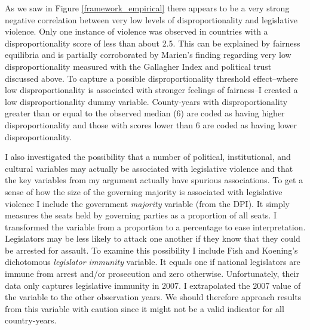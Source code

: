 \documentclass[a4paper]{article}\usepackage[]{graphicx}\usepackage[]{color}
\begin{document}
As we saw in Figure \ref{framework_empirical} there appears to be a very strong negative correlation between very low levels of disproportionality and legislative violence. Only one instance of violence was observed in countries with a disproportionality score of less than about 2.5. This can be explained by fairness equilibria and is partially corroborated by Marien's \citeyearpar{Marien2011} finding regarding very low disproportionality measured with the Gallagher Index and political trust discussed above. To capture a possible disproportionality threshold effect--where low disproportionality is associated with stronger feelings of fairness--I created a low disproportionality dummy variable. County-years with disproportionality greater than or equal to the observed median (6) are coded as having higher disproportionality and those with scores lower than 6 are coded as having lower disproportionality. 

I also investigated the possibility that a number of political, institutional, and cultural variables may actually be associated with legislative violence and that the key variables from my argument actually have spurious associations. To get a sense of how the size of the governing majority is associated with legislative violence I include the government {\emph{majority}} variable (from the DPI). It simply measures the seats held by governing parties as a proportion of all seats. I transformed the variable from a proportion to a percentage to ease interpretation. Legislators may be less likely to attack one another if they know that they could be arrested for assault. To examine this possibility I include Fish and Koening's \citeyearpar{Fish2009} dichotomous \emph{legislator immunity} variable. It equals one if national legislators are immune from arrest and/or prosecution and zero otherwise. Unfortunately, their data only captures legislative immunity in 2007. I extrapolated the 2007 value of the variable to the other observation years. We should therefore approach results from this variable with caution since it might not be a valid indicator for all country-years.
\end{document}
